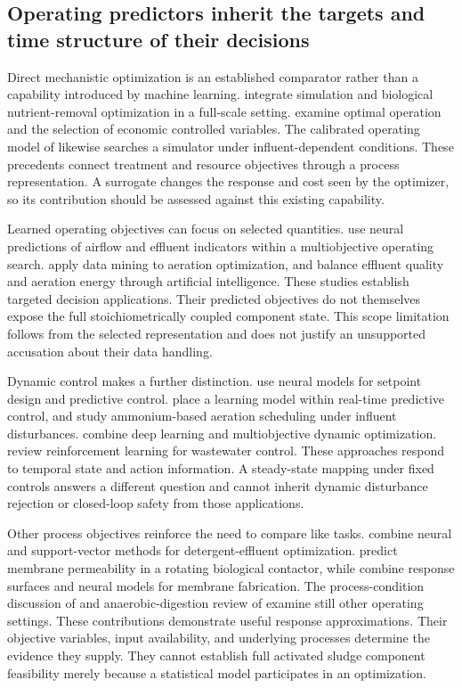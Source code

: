 \subsection{Operating predictors inherit the targets and time structure of their decisions}

Direct mechanistic optimization is an established comparator rather than a capability introduced by machine learning. \citet{Fang2011} integrate simulation and biological nutrient-removal optimization in a full-scale setting. \citet{Araujo2013} examine optimal operation and the selection of economic controlled variables. The calibrated operating model of \citet{Nazif2023} likewise searches a simulator under influent-dependent conditions. These precedents connect treatment and resource objectives through a process representation. A surrogate changes the response and cost seen by the optimizer, so its contribution should be assessed against this existing capability.

Learned operating objectives can focus on selected quantities. \citet{KusiakWei2013} use neural predictions of airflow and effluent indicators within a multiobjective operating search. \citet{Asadi2017} apply data mining to aeration optimization, and \citet{Mao2024} balance effluent quality and aeration energy through artificial intelligence. These studies establish targeted decision applications. Their predicted objectives do not themselves expose the full stoichiometrically coupled component state. This scope limitation follows from the selected representation and does not justify an unsupported accusation about their data handling.

Dynamic control makes a further distinction. \citet{Sadeghassadi2018} use neural models for setpoint design and predictive control. \citet{Bernardelli2020} place a learning model within real-time predictive control, and \citet{Ren2026} study ammonium-based aeration scheduling under influent disturbances. \citet{Niu2022} combine deep learning and multiobjective dynamic optimization. \citet{Croll2023} review reinforcement learning for wastewater control. These approaches respond to temporal state and action information. A steady-state mapping under fixed controls answers a different question and cannot inherit dynamic disturbance rejection or closed-loop safety from those applications.

Other process objectives reinforce the need to compare like tasks. \citet{Jana2022} combine neural and support-vector methods for detergent-effluent optimization. \citet{Waqas2022} predict membrane permeability in a rotating biological contactor, while \citet{Li2022} combine response surfaces and neural models for membrane fabrication. The process-condition discussion of \citet{Shojaei2021} and anaerobic-digestion review of \citet{Poh2016} examine still other operating settings. These contributions demonstrate useful response approximations. Their objective variables, input availability, and underlying processes determine the evidence they supply. They cannot establish full activated sludge component feasibility merely because a statistical model participates in an optimization.

